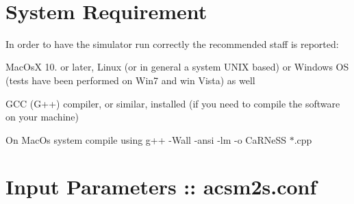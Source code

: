 ~\newline
~\newline
 \hypertarget{a00002_sysreq}{}\section{System Requirement}\label{a00002_sysreq}


 In order to have the simulator run correctly the recommended staff is reported\+:
\begin{DoxyItemize}
\item Mac\+Os\+X 10. or later, Linux (or in general a system U\+N\+I\+X based) or Windows O\+S (tests have been performed on Win7 and win Vista) as well
\item G\+C\+C (G++) compiler, or similar, installed (if you need to compile the software on your machine)
\end{DoxyItemize}

On Mac\+Os system compile using {\ttfamily g++} -\/\+Wall -\/ansi -\/lm -\/o Ca\+R\+Ne\+S\+S $\ast$.cpp ~\newline
~\newline
 \hypertarget{a00002_parameters}{}\section{Input Parameters \+:: acsm2s.\+conf}\label{a00002_parameters}


